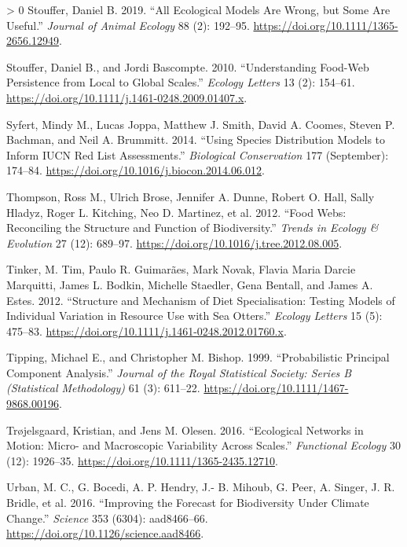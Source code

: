 \documentclass[10pt,oneside]{article}
\newlength{\cslhangindent}
\newenvironment{CSLReferences}[3] %
 {%
  \setlength{\parindent}{0pt}
  \ifodd #1 \everypar{\setlength{\hangindent}{\cslhangindent}}\ignorespaces\fi
  \ifnum #2 > 0
  \setlength{\parskip}{#2\baselineskip}
  \fi
 }%
 {}
\begin{document}
\begin{CSLReferences}{1}{0}
\leavevmode\hypertarget{ref-Stouffer2019AllEco}{}%
Stouffer, Daniel B. 2019. {``All Ecological Models Are Wrong, but Some
Are Useful.''} \emph{Journal of Animal Ecology} 88 (2): 192--95.
\url{https://doi.org/10.1111/1365-2656.12949}.

\leavevmode\hypertarget{ref-Stouffer2010UndFoo}{}%
Stouffer, Daniel B., and Jordi Bascompte. 2010. {``Understanding
Food-Web Persistence from Local to Global Scales.''} \emph{Ecology
Letters} 13 (2): 154--61.
\url{https://doi.org/10.1111/j.1461-0248.2009.01407.x}.

\leavevmode\hypertarget{ref-Syfert2014UsiSpe}{}%
Syfert, Mindy M., Lucas Joppa, Matthew J. Smith, David A. Coomes, Steven
P. Bachman, and Neil A. Brummitt. 2014. {``Using Species Distribution
Models to Inform IUCN Red List Assessments.''} \emph{Biological
Conservation} 177 (September): 174--84.
\url{https://doi.org/10.1016/j.biocon.2014.06.012}.

\leavevmode\hypertarget{ref-Thompson2012FooWeb}{}%
Thompson, Ross M., Ulrich Brose, Jennifer A. Dunne, Robert O. Hall,
Sally Hladyz, Roger L. Kitching, Neo D. Martinez, et al. 2012. {``Food
Webs: Reconciling the Structure and Function of Biodiversity.''}
\emph{Trends in Ecology \& Evolution} 27 (12): 689--97.
\url{https://doi.org/10.1016/j.tree.2012.08.005}.

\leavevmode\hypertarget{ref-Tinker2012StrMec}{}%
Tinker, M. Tim, Paulo R. Guimarães, Mark Novak, Flavia Maria Darcie
Marquitti, James L. Bodkin, Michelle Staedler, Gena Bentall, and James
A. Estes. 2012. {``Structure and Mechanism of Diet Specialisation:
Testing Models of Individual Variation in Resource Use with Sea
Otters.''} \emph{Ecology Letters} 15 (5): 475--83.
\url{https://doi.org/10.1111/j.1461-0248.2012.01760.x}.

\leavevmode\hypertarget{ref-Tipping1999ProPri}{}%
Tipping, Michael E., and Christopher M. Bishop. 1999. {``Probabilistic
Principal Component Analysis.''} \emph{Journal of the Royal Statistical
Society: Series B (Statistical Methodology)} 61 (3): 611--22.
\url{https://doi.org/10.1111/1467-9868.00196}.

\leavevmode\hypertarget{ref-Trojelsgaard2016EcoNet}{}%
Trøjelsgaard, Kristian, and Jens M. Olesen. 2016. {``Ecological Networks
in Motion: Micro- and Macroscopic Variability Across Scales.''}
\emph{Functional Ecology} 30 (12): 1926--35.
\url{https://doi.org/10.1111/1365-2435.12710}.

\leavevmode\hypertarget{ref-Urban2016ImpFor}{}%
Urban, M. C., G. Bocedi, A. P. Hendry, J.- B. Mihoub, G. Peer, A.
Singer, J. R. Bridle, et al. 2016. {``Improving the Forecast for
Biodiversity Under Climate Change.''} \emph{Science} 353 (6304):
aad8466--66. \url{https://doi.org/10.1126/science.aad8466}.


\end{CSLReferences}
\end{document}
